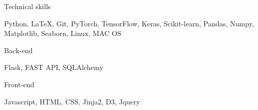 

\begin{cventries}

\begin{cvskills}    
        
    \cvskill
    {Technical skills}
    {\begin{minipage}[t]{0.7\textwidth}
        Python, LaTeX, Git, PyTorch, TensorFlow, Keras, Scikit-learn, Pandas, Numpy, Matplotlib, Seaborn, Linux, MAC OS
    \end{minipage}
    }
    \cvskill
    {Back-end}
    {\begin{minipage}[t]{0.7\textwidth}
        Flask, FAST API, SQLAlchemy
    \end{minipage}
    }
    \cvskill
    {Front-end}
    {\begin{minipage}[t]{0.7\textwidth}
        Javascript, HTML, CSS, Jinja2, D3, Jquery
    \end{minipage}
    }

\end{cvskills}  


\end{cventries}
